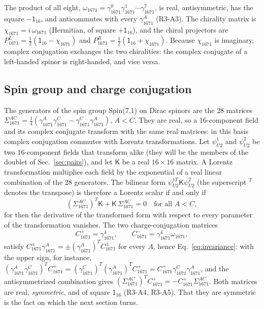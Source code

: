 The product of all eight, $\omega_{1671}=\gamma^0_{1671}\gamma^1_{1671}\cdots\gamma^7_{1671}$, is
real, antisymmetric, has the square $-\mathsf 1_{16}$, and anticommutes with every
$\gamma^A_{1671}$ (R3-A3). The chirality matrix is $\chi_{1671}=i\,\omega_{1671}$ (Hermitian, of
square $+\mathsf 1_{16}$), and the chiral projectors are
$P^{L}_{1671}=\tfrac12(\mathsf 1_{16}-\chi_{1671})$ and
$P^{R}_{1671}=\tfrac12(\mathsf 1_{16}+\chi_{1671})$. Because $\chi_{1671}$ is imaginary, complex
conjugation exchanges the two chiralities: the complex conjugate of a left-handed spinor is
right-handed, and vice versa.

\subsection{Spin group and charge conjugation}

The generators of the spin group Spin(7,1) on Dirac spinors are the 28 matrices
$\Sigma^{AC}_{1671}=\tfrac14(\gamma^A_{1671}\gamma^C_{1671}-\gamma^C_{1671}\gamma^A_{1671})$,
$A<C$. They are real, so a 16-component field and its complex conjugate transform with the same
real matrices: in this basis complex conjugation commutes with Lorentz transformations. Let
$\psi^1_{U2}$ and $\psi^2_{U2}$ be two 16-component fields that transform alike (they will be
the members of the doublet of Sec.~\ref{sec:pairs}), and let $\mathsf K$ be a real
$16\times16$ matrix. A Lorentz transformation multiplies each field by the exponential of a real
linear combination of the 28 generators. The bilinear form $\psi^{1T}_{U2}\mathsf K\psi^2_{U2}$
(the superscript ${}^T$ denotes the transpose) is therefore a Lorentz scalar if and only if
\begin{equation}
(\Sigma^{AC}_{1671})^T\mathsf K+\mathsf K\,\Sigma^{AC}_{1671}=0\quad\text{for all }A<C,
\label{eq:invariance}
\end{equation}
for then the derivative of the transformed form with respect to every parameter of the
transformation vanishes. The two charge-conjugation matrices
\begin{equation}
C^+_{1671}=\gamma^4_{1671},\qquad C^-_{1671}=\gamma^4_{1671}\omega_{1671},
\label{eq:cpm}
\end{equation}
satisfy $C^\pm_{1671}\gamma^A_{1671}=\pm(\gamma^A_{1671})^TC^\pm_{1671}$ for every $A$, hence
Eq.~\eqref{eq:invariance}: with the upper sign, for instance,
$(\gamma^A_{1671}\gamma^C_{1671})^TC^+_{1671}=(\gamma^C_{1671})^T(\gamma^A_{1671})^TC^+_{1671}
=C^+_{1671}\gamma^C_{1671}\gamma^A_{1671}$, and the antisymmetrized combination gives
$(\Sigma^{AC}_{1671})^TC^+_{1671}=-C^+_{1671}\Sigma^{AC}_{1671}$. Both matrices are real,
\emph{symmetric}, and of square $\mathsf 1_{16}$ (R3-A4, R3-A5). That they are symmetric is the
fact on which the next section turns.
